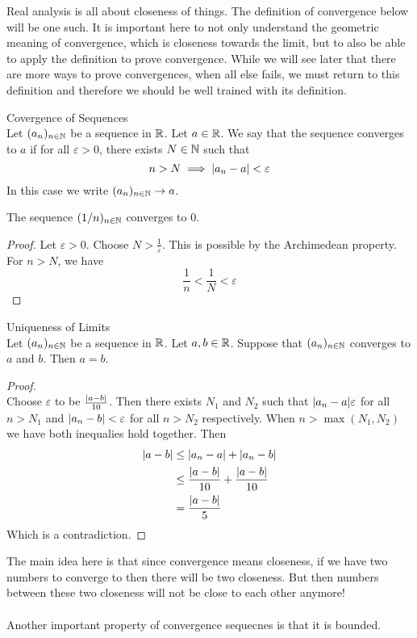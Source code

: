 \documentclass[a4paper]{article}
\begin{document}
Real analysis is all about closeness of things. The definition of convergence below will be one such. It is important here to not only understand the geometric meaning of convergence, which is closeness towards the limit, but to also be able to apply the definition to prove convergence. While we will see later that there are more ways to prove convergences, when all else fails, we must return to this definition and therefore we should be well trained with its definition. 

\begin{defn}{Covergence of Sequences}{}\\
Let $(a_n)_{n\in\mathbb{N}}$ be a sequence in $\mathbb{R}$. Let $a\in\mathbb{R}$. We say that the sequence converges to $a$ if for all $\varepsilon>0$, there exists $N\in\mathbb{N}$ such that $$n>N\implies \abs{a_n-a}<\varepsilon$$ In this case we write $(a_n)_{n\in\mathbb{N}}\to a$. 
\end{defn}

\begin{eg}{}{} The sequence $(1/n)_{n\in\mathbb{N}}$ converges to $0$. 
\begin{proof}
Let $\varepsilon>0$. Choose $N>\frac{1}{\varepsilon}$. This is possible by the Archimedean property. For $n>N$, we have $$\frac{1}{n}<\frac{1}{N}<\varepsilon$$
\end{proof}
\end{eg}

\begin{prp}{Uniqueness of Limits}{}\\
Let $(a_n)_{n\in\mathbb{N}}$ be a sequence in $\mathbb{R}$. Let $a,b\in\mathbb{R}$. Suppose that $(a_n)_{n\in\mathbb{N}}$ converges to $a$ and $b$. Then $a=b$. 
\begin{proof}\\
Choose $\varepsilon$ to be $\frac{\abs{a-b}}{10}$. Then there exists $N_1$ and $N_2$ such that $\abs{a_n-a}\varepsilon$ for all $n>N_1$ and $\abs{a_n-b}<\varepsilon$ for all $n>N_2$ respectively. When $n>\max{(N_1,N_2)}$ we have both inequalies hold together. Then 
\begin{align*}
\abs{a-b}&\leq\abs{a_n-a}+\abs{a_n-b}\\
&\leq \frac{\abs{a-b}}{10}+\frac{\abs{a-b}}{10}\\
&=\frac{\abs{a-b}}{5}
\end{align*}
Which is a contradiction. 
\end{proof}
\end{prp}

The main idea here is that since convergence means closeness, if we have two numbers to converge to then there will be two closeness. But then numbers between these two closeness will not be close to each other anymore! \\~\\
Another important property of convergence sequecnes is that it is bounded. 
\end{document}
